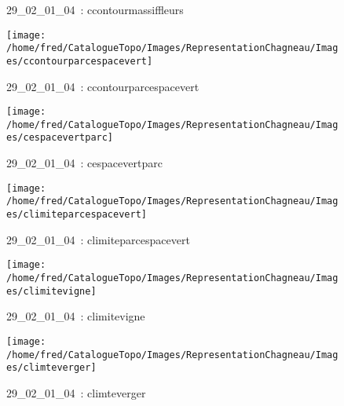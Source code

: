 \documentclass[12pt,titlepage]{book}
\begin{document}
\begin{figure}[h!]
\begin{minipage}[t]{3cm}
\begin{center}
      \caption[~29\_02\_01\_04]{\small{29\_02\_01\_04~:} \tiny{ccontourmassiffleurs}}\label{ccontourmassiffleurs}
    \end{center}
  \end{minipage}
  \begin{minipage}[t]{3cm}
    \begin{center}
      \texttt{[image: /home/fred/CatalogueTopo/Images/RepresentationChagneau/Images/ccontourparcespacevert]}
      \caption[~29\_02\_01\_04]{\small{29\_02\_01\_04~:} \tiny{ccontourparcespacevert}}\label{ccontourparcespacevert}
    \end{center}
  \end{minipage}
  \begin{minipage}[t]{3cm}
    \begin{center}
      \texttt{[image: /home/fred/CatalogueTopo/Images/RepresentationChagneau/Images/cespacevertparc]}
      \caption[~29\_02\_01\_04]{\small{29\_02\_01\_04~:} \tiny{cespacevertparc}}\label{cespacevertparc}
    \end{center}
  \end{minipage}
  \begin{minipage}[t]{3cm}
    \begin{center}
      \texttt{[image: /home/fred/CatalogueTopo/Images/RepresentationChagneau/Images/climiteparcespacevert]}
      \caption[~29\_02\_01\_04]{\small{29\_02\_01\_04~:} \tiny{climiteparcespacevert}}\label{climiteparcespacevert}
    \end{center}
  \end{minipage}
  \begin{minipage}[t]{3cm}
    \begin{center}
      \texttt{[image: /home/fred/CatalogueTopo/Images/RepresentationChagneau/Images/climitevigne]}
      \caption[~29\_02\_01\_04]{\small{29\_02\_01\_04~:} \tiny{climitevigne}}\label{climitevigne}
    \end{center}
  \end{minipage}
  \begin{minipage}[t]{3cm}
    \begin{center}
      \texttt{[image: /home/fred/CatalogueTopo/Images/RepresentationChagneau/Images/climteverger]}
      \caption[~29\_02\_01\_04]{\small{29\_02\_01\_04~:} \tiny{climteverger}}\label{climteverger}

\end{center}
\end{minipage}
\end{figure}
\end{document}

